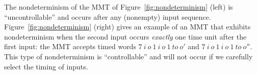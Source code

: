 %
%
The nondeterminism of the MMT of Figure~\ref{fig:nondeterminism} (left)
is ``uncontrollable'' and occurs after any (nonempty) input sequence.
Figure~\ref{fig:nondeterminism} (right) gives an example of an MMT that exhibits nondeterminism when the second input occurs \emph{exactly} one time unit after the first input: the MMT accepts timed words
$7 ~ i ~ o ~ 1 ~ i ~ o ~ 1 ~ \mathit{to} ~ o'$ and $7 ~ i ~ o ~ 1 ~ i ~ o ~ 1 ~ \mathit{to} ~ o''$.
This type of nondeterminism is ``controllable'' and will not occur if we carefully
select the timing of inputs.



